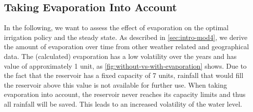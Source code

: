 \documentclass[12pt, a4paper, oneside]{article}
\begin{document}
\subsection{Taking Evaporation Into Account}
In the following, we want to assess the effect of evaporation on the optimal irrigation policy and the steady state. 
As described in \ref{sec:intro-mod4}, we derive the amount of evaporation over time from other weather related and geographical data. 
The (calculated) evaporation has a low volatility over the years and has value of approximately 1 unit, as \ref{fig:without-vs-with-evaporation} shows. 
Due to the fact that the reservoir has a fixed capacity of 7 units, rainfall that would fill the reservoir above this value is not available for further use. 
When taking evaporation into account, the reservoir never reaches its capacity limits and thus all rainfall will be saved. This leads to an increased volatility of the water level. 
\\
\end{document}
